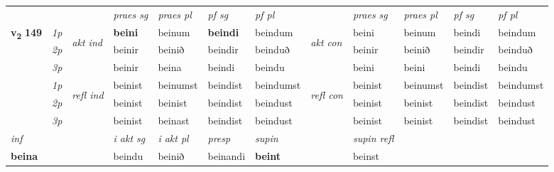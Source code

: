 \begin{longtable}[l]{X>{\footnotesize\itshape}llXXXXlXXXX}
 & &   & \textit{praes sg}  & \textit{praes pl}    & \textit{ pf sg} & \textit{pf pl} & & \textit{praes sg}  & \textit{praes pl}    & \textit{pf sg} & \textit{pf pl }  \\ \cmidrule{4-7} \cmidrule{9-12}
 \multirow{2}{*}{{{\textbf{v{\textsubscript{2}}} \Large{\textbf{149}}}}}  & 1p & \multirow{3}{*}{\begin{turn}{90}\textit{akt ind}\end{turn}} & \textbf{beini} & beinum & \textbf{beindi} & beindum & \multirow{3}{*}{\begin{turn}{90}\textit{akt con}\end{turn}} &beini & beinum & beindi & beindum\\*
 & 2p &  &  beinir  & beinið & beindir & beinduð & & beinir & beinið & beindir & beinduð \\*
 & 3p &  & beinir & beina & beindi & beindu & & beini & beini& beindi & beindu \\*
\cmidrule{4-7} \cmidrule{9-12}
 & 1p & \multirow{3}{*}{\begin{turn}{90}\textit{refl ind}\end{turn}}  & beinist & beinumst & beindist & beindumst & \multirow{3}{*}{\begin{turn}{90}\textit{refl con}\end{turn}}  &beinist & beinumst & beindist & beindumst \\*
 & 2p &  & beinist & beinist & beindist & beindust & &beinist & beinist & beindist & beindust \\*
 & 3p  & & beinist & beinast & beindist & beindust & & beinist & beinist& beindist & beindust \\*
\cmidrule{4-7} \cmidrule{9-12}

   {\textit{inf}} & &  & \textit{i akt sg} & \textit{i akt pl}   & \textit{presp} & \textit{supin} && \textit{supin refl}  \\*
  {\textbf{beina}} & && beindu  & beinið   & beinandi &  \textbf{beint} && beinst  \\*

\midrule


\end{longtable}
